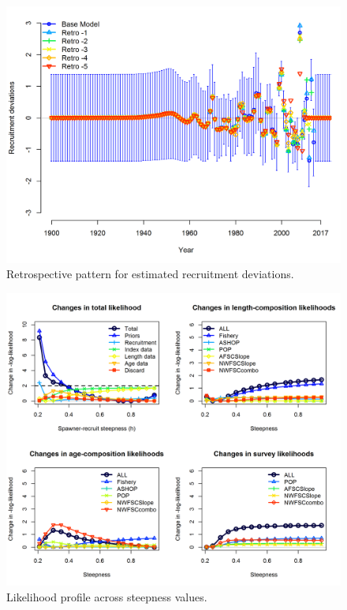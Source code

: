 \documentclass[12pt,]{article}
\begin{document}
\FloatBarrier

\begin{figure}
\centering
\includegraphics{Figures/compare10_recdevs_uncertainty.png}
\caption{Retrospective pattern for estimated recruitment deviations.
\label{fig:retro_recdev}}
\end{figure}

\FloatBarrier

\begin{figure}
\centering
\includegraphics{Figures/piner_panel_h.png}
\caption{Likelihood profile across steepness values.
\label{fig:piner_h}}
\end{figure}
\end{document}
